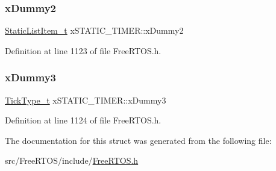 \subsubsection{\texorpdfstring{x\+Dummy2}{xDummy2}}
{\footnotesize\ttfamily \hyperlink{_free_r_t_o_s_8h_a1d31bc0472385a87424518da484d9e09}{Static\+List\+Item\+\_\+t} x\+S\+T\+A\+T\+I\+C\+\_\+\+T\+I\+M\+E\+R\+::x\+Dummy2}



Definition at line 1123 of file Free\+R\+T\+O\+S.\+h.

\mbox{\label{structx_s_t_a_t_i_c___t_i_m_e_r_a60d582d1d0b5b9b15e8050d5ae29bc30}} 
\subsubsection{\texorpdfstring{x\+Dummy3}{xDummy3}}
{\footnotesize\ttfamily \hyperlink{portmacro_8h_aa69c48c6e902ce54f70886e6573c92a9}{Tick\+Type\+\_\+t} x\+S\+T\+A\+T\+I\+C\+\_\+\+T\+I\+M\+E\+R\+::x\+Dummy3}



Definition at line 1124 of file Free\+R\+T\+O\+S.\+h.



The documentation for this struct was generated from the following file\+:\begin{DoxyCompactItemize}
\item 
src/\+Free\+R\+T\+O\+S/include/\hyperlink{_free_r_t_o_s_8h}{Free\+R\+T\+O\+S.\+h}\end{DoxyCompactItemize}
